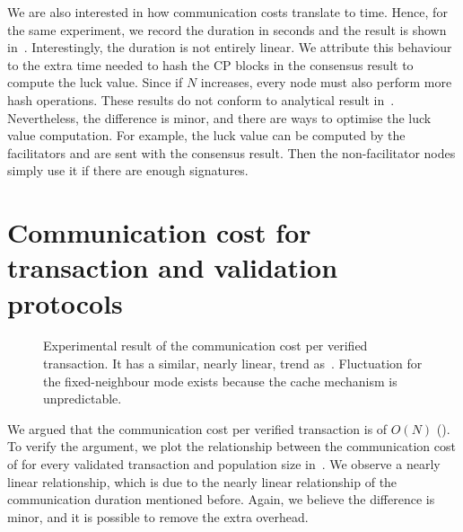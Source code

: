 We are also interested in how communication costs translate to time.
Hence, for the same experiment, we record the duration in seconds and the result is shown in~.
Interestingly, the duration is not entirely linear.
We attribute this behaviour to the extra time needed to hash the CP blocks in the consensus result to compute the luck value.
Since if $N$ increases, every node must also perform more hash operations.
These results do not conform to analytical result in~.
Nevertheless, the difference is minor, and there are ways to optimise the luck value computation.
For example, the luck value can be computed by the facilitators and are sent with the consensus result.
Then the non-facilitator nodes simply use it if there are enough signatures.

\section{Communication cost for transaction and validation protocols}

\begin{figure}[tb]
  \centering
  \caption{Experimental result of the communication cost per verified transaction.
  It has a similar, nearly linear, trend as~.
  Fluctuation for the fixed-neighbour mode exists because the cache mechanism is unpredictable.}
  \label{fig:tx-comms}
\end{figure}

We argued that the communication cost per verified transaction is of $O(N)$ ().
To verify the argument, we plot the relationship between the communication cost of for every validated transaction and population size in~.
We observe a nearly linear relationship, which is due to the nearly linear relationship of the communication duration mentioned before.
Again, we believe the difference is minor, and it is possible to remove the extra overhead.

